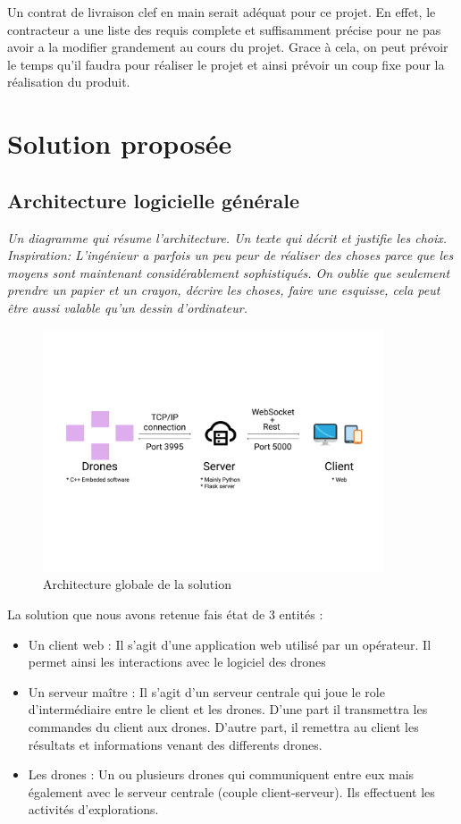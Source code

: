 \documentclass{mistcoursedoc}
\begin{document}
Un contrat de livraison clef en main serait adéquat pour ce projet. En effet, le contracteur a une liste des requis complete et suffisamment précise pour ne pas avoir a la modifier grandement au cours du projet.
Grace à cela, on peut prévoir le temps qu'il faudra pour réaliser le projet et ainsi prévoir un coup fixe pour la réalisation du produit.

\section{Solution proposée}

\subsection{Architecture logicielle générale}

\textit{Un diagramme qui résume l’architecture.  Un texte qui décrit et justifie les choix. Inspiration: \og L’ingénieur a parfois un peu peur de réaliser des choses parce que les moyens sont maintenant considérablement sophistiqués. On oublie que seulement prendre un papier et un crayon, décrire les choses, faire une esquisse, cela peut être aussi valable qu’un dessin d’ordinateur.}

\begin{figure}[h!]
  \centering\includegraphics[width=0.9\textwidth]{architecture-globale.pdf}
  \caption{Architecture globale de la solution}
\end{figure}

\par La solution que nous avons retenue fais état de 3 entités :
\begin{itemize}
    \item Un client web : Il s'agit d'une application web utilisé par un opérateur. Il permet ainsi les interactions avec le logiciel des drones
    \item Un serveur maître : Il s'agit d'un serveur centrale qui joue le role d'intermédiaire entre le client et les drones. D'une part il transmettra les commandes du client aux drones. D'autre part, il remettra au client les résultats et informations venant des differents drones.
    \item Les drones : Un ou plusieurs drones qui communiquent entre eux mais également avec le serveur centrale (couple client-serveur). Ils effectuent les activités d'explorations.
\end{itemize}
\end{document}
